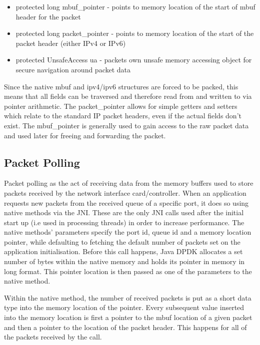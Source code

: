 \documentclass[final_report.tex]{subfiles}
\begin{document}
\begin{itemize}
	\item protected long mbuf\_pointer - points to memory location of the start of mbuf header for the packet
	\item protected long packet\_pointer - points to memory location of the start of the packet header (either IPv4 or IPv6)
	\item protected UnsafeAccess ua - packets own unsafe memory accessing object for secure navigation around packet data
\end{itemize}

Since the native mbuf and ipv4/ipv6 structures are forced to be packed,  this means that all fields can be traversed and therefore read from and written to via pointer arithmetic. The packet\_pointer allows for simple getters and setters which relate to the standard IP packet headers, even if the actual fields don't exist. The mbuf\_pointer is generally used to gain access to the raw packet data and used later for freeing and forwarding the packet.

\subsection{Packet Polling}
Packet polling as the act of receiving data from the memory buffers used to store packets received by the network interface card/controller. When an application requests new packets from the received queue of a specific port, it does so using native methods via the JNI. These are the only JNI calls used after the initial start up (i.e used in processing threads) in order to increase performance. The native methods' parameters specify the port id, queue id and a memory location pointer, while defaulting to fetching the default number of packets set on the application initialisation. Before this call happens, Java DPDK allocates a set number of bytes within the native memory and holds its pointer in memory in long format. This pointer location is then passed as one of the parameters to the native method.

Within the native method, the number of received packets is put as a short data type into the memory location of the pointer. Every subsequent value inserted into the memory location is first a pointer to the mbuf location of a given packet and then a pointer to the location of the packet header. This happens for all of the packets received by the call.
\end{document}
